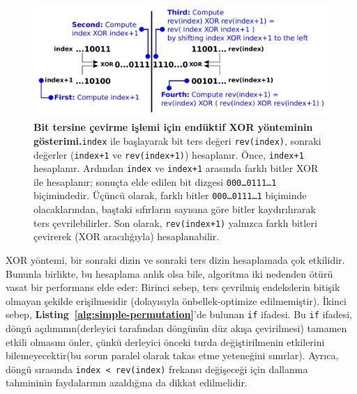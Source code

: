 \documentclass[10pt]{article}
\begin{document}
\begin{figure}
\centering
\includegraphics[width=6in]{cartoons/xor.pdf}
\caption{{\bf Bit tersine \c{c}evirme i\c{s}lemi i\c{c}in end\"{u}ktif XOR y\"{o}nteminin 
g\"{o}sterimi.}{\tt index} ile ba\c{s}layarak bit ters de\u{g}eri {\tt rev(index)}, sonraki de\u{g}erler 
({\tt index+1} ve {\tt rev(index+1)}) hesaplan{\i}r. \"{O}nce, {\tt index+1} hesaplan{\i}r. 
Ard{\i}ndan {\tt index} ve {\tt index+1} aras{\i}nda farkl{\i} bitler XOR ile hesaplan{\i}r; 
sonu\c{c}ta elde edilen bit dizgesi {\tt 000\ldots 0111\ldots 1} bi\c{c}imindedir. \"{U}\c{c}\"{u}nc\"{u} olarak,
farkl{\i} bitler {\tt 000\ldots 0111\ldots 1} bi\c{c}iminde olacaklar{\i}ndan, ba\c{s}taki 
s{\i}f{\i}rlar{\i}n say{\i}s{\i}na g\"{o}re bitler kayd{\i}r{\i}l{\i}rarak ters \c{c}evrilebilirler. Son olarak, 
{\tt rev(index+1)} yaln{\i}zca farkl{\i} bitleri \c{c}evirerek (XOR arac{\i}l{\i}\u{g}{\i}yla) hesaplanabilir.
\label{figure:xor}}
\end{figure}

XOR y\"{o}ntemi, bir sonraki dizin ve sonraki ters dizin hesaplamada \c{c}ok etkilidir.
Bununla birlikte, bu hesaplama anl{\i}k olsa bile, algoritma iki nedenden \"{o}t\"{u}r\"{u} vasat bir
performans elde eder: Birinci sebep, ters \c{c}evrilmi\c{s} endekslerin biti\c{s}ik olmayan 
\c{s}ekilde eri\c{s}ilmesidir (dolay{\i}s{\i}yla \"{o}nbellek-optimize edilmemi\c{s}tir). \.{I}kinci sebep, 
{\bf  Listing~\ref{alg:simple-permutation}}'de bulunan {\tt if} ifadesi. Bu {\tt if} ifadesi, 
d\"{o}ng\"{u} a\c{c}{\i}l{\i}m{\i}n{\i}n(derleyici taraf{\i}ndan d\"{o}ng\"{u}n\"{u}n d\"{u}z ak{\i}\c{s}a \c{c}evirilmesi) 
tamamen etkili olmas{\i}n{\i} \"{o}nler, 
\c{c}\"{u}nk\"{u} derleyici \"{o}nceki turda de\u{g}i\c{s}tirilmenin etkilerini bilemeyecektir(bu sorun paralel
olarak takas etme yetene\u{g}ini s{\i}n{\i}rlar). Ayr{\i}ca, d\"{o}ng\"{u} s{\i}ras{\i}nda {\tt index < rev(index)}
frekans{\i} de\u{g}i\c{s}ece\u{g}i i\c{c}in dallanma tahmininin faydalar{\i}n{\i}n azald{\i}\u{g}{\i}na da dikkat edilmelidir.
\end{document}
